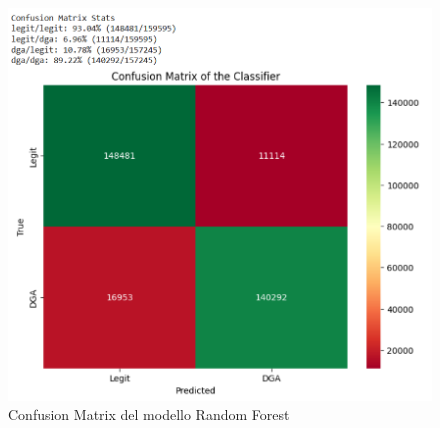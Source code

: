 \documentclass[12pt,a4paper,openright,twoside]{book}
\begin{document}
\begin{figure}[H]
    \centering
    \includegraphics[width=.8\linewidth]{figures/RF_conf_matr.png}
    \caption{Confusion Matrix del modello Random Forest}
    \label{fig:RF confusion matrix}
\end{figure}
\end{document}
